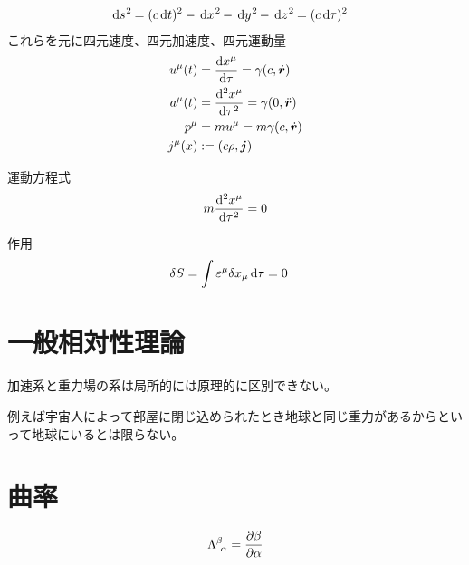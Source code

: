 \documentclass[uplatex,dvipdfmx,a4paper,11pt]{jlreq}
\newcommand{\rr}{\bm{r}}
\theoremstyle{definition}
\begin{document}
\begin{definition}[世界間隔]
  \begin{align}
    \dl{s}^2 & = (c\dl{t})^2 - \dl{x}^2 - \dl{y}^2 - \dl{z}^2 = (c\dl{\tau})^2
  \end{align}
  これらを元に四元速度、四元加速度、四元運動量
  \begin{align}
    u^\mu(t) & = \diff{x^\mu}{\tau} = \gamma(c, \dot{\rr})     \\
    a^\mu(t) & = \diff[2]{x^\mu}{\tau} = \gamma(0, \ddot{\rr}) \\
    p^\mu    & = mu^\mu = m\gamma(c, \dot{\rr})                \\
    j^\mu(x) & := (c\rho, \bm{j})                              \\
  \end{align}
\end{definition}

運動方程式
\begin{align}
  m\diff[2]{x^\mu}{\tau} = 0
\end{align}

作用
\begin{align}
  \delta S & = \int \varepsilon^\mu\delta x_\mu\dl{\tau} = 0
\end{align}

\section{一般相対性理論}
\begin{axiom}[アインシュタインの等価原理]
  加速系と重力場の系は局所的には原理的に区別できない。
\end{axiom}
例えば宇宙人によって部屋に閉じ込められたとき地球と同じ重力があるからといって地球にいるとは限らない。

\section{曲率}
\begin{align}
  \Lambda^\beta_{\ \alpha} = \diffp{\beta}{\alpha}
\end{align}
\end{document}
